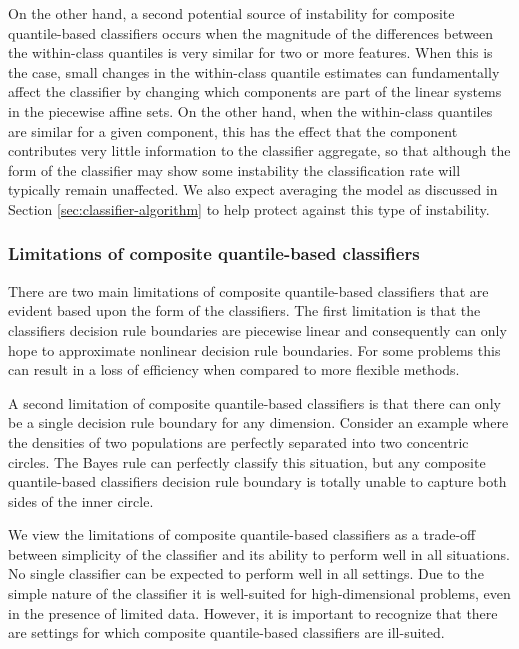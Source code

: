 On the other hand, a second potential source of instability for composite
quantile-based classifiers occurs when the magnitude of the differences between
the within-class quantiles is very similar for two or more features.  When this
is the case, small changes in the within-class quantile estimates can
fundamentally affect the classifier by changing which components are part of the
linear systems in the piecewise affine sets.  On the other hand, when the
within-class quantiles are similar for a given component, this has the effect
that the component contributes very little information to the classifier
aggregate, so that although the form of the classifier may show some instability
the classification rate will typically remain unaffected.  We also expect
averaging the model as discussed in Section \ref{sec:classifier-algorithm} to
help protect against this type of instability.




\subsubsection{Limitations of composite quantile-based classifiers}
\label{sec:limitations}

There are two main limitations of composite quantile-based classifiers that are
evident based upon the form of the classifiers.  The first limitation is that
the classifiers decision rule boundaries are piecewise linear and consequently
can only hope to approximate nonlinear decision rule boundaries.  For some
problems this can result in a loss of efficiency when compared to more flexible
methods.

A second limitation of composite quantile-based classifiers is that there can
only be a single decision rule boundary for any dimension.  Consider an example
where the densities of two populations are perfectly separated into two
concentric circles.  The Bayes rule can perfectly classify this situation, but
any composite quantile-based classifiers decision rule boundary is totally
unable to capture both sides of the inner circle.

We view the limitations of composite quantile-based classifiers as a trade-off
between simplicity of the classifier and its ability to perform well in all
situations.  No single classifier can be expected to perform well in all
settings.  Due to the simple nature of the classifier it is well-suited for
high-dimensional problems, even in the presence of limited data.  However, it is
important to recognize that there are settings for which composite
quantile-based classifiers are ill-suited.




